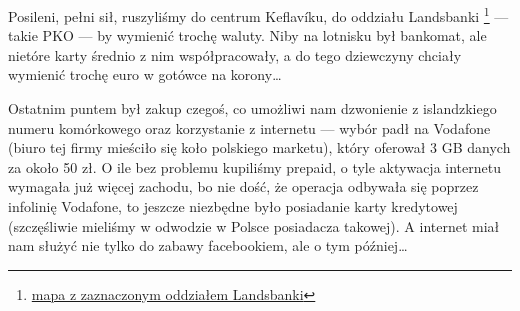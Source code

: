 

Posileni, pełni sił, ruszyliśmy do centrum Keflavíku, do oddziału Landsbanki \footnote{\href{https://www.google.com/url?q=https\%3A\%2F\%2Fmaps.google.com\%2Fmaps\%3Fq\%3D63.995522\%2C-22.548067}{mapa z zaznaczonym oddziałem Landsbanki}} --- takie PKO --- by wymienić trochę waluty. Niby na lotnisku był bankomat, ale nietóre karty średnio z nim współpracowały, a do tego dziewczyny chciały wymienić trochę euro w gotówce na korony…


Ostatnim puntem był zakup czegoś, co umożliwi nam dzwonienie z islandzkiego numeru komórkowego oraz korzystanie z internetu --- wybór padł na Vodafone (biuro tej firmy mieściło się koło polskiego marketu), który oferował 3 GB danych za około 50 zł. O ile bez problemu kupiliśmy prepaid, o tyle aktywacja internetu wymagała już więcej zachodu, bo nie dość, że operacja odbywała się poprzez infolinię Vodafone, to jeszcze niezbędne było posiadanie karty kredytowej (szczęśliwie mieliśmy w odwodzie w Polsce posiadacza takowej). A internet miał nam służyć nie tylko do zabawy facebookiem, ale o tym później…


